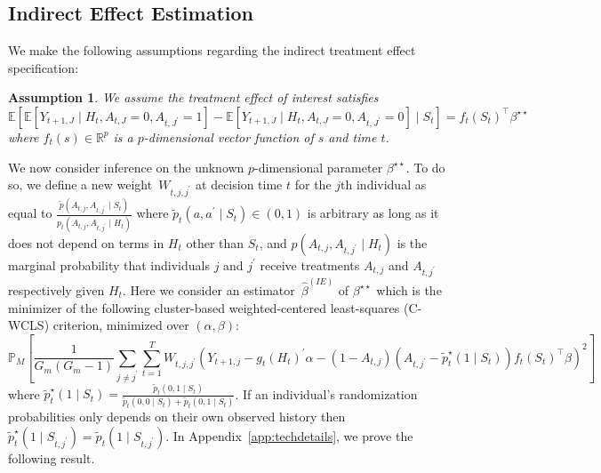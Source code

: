 \documentclass[12pt]{article}
\def\E{\mathbb{E}}
\newtheorem{assumption}[thm]{Assumption}
\begin{document}
\subsection{Indirect Effect Estimation}
\label{section:indirect}

We make the following assumptions regarding the indirect treatment effect specification:

\begin{assumption} \normalfont
\label{ass:indirecteffect}
We assume the treatment effect of interest satisfies
$$
\E \left[ \E \left[ Y_{t+1, J} \mid H_t, A_{t,J} = 0, A_{t,J^\prime} = 1 \right] - \E \left[ Y_{t+1, J} \mid H_t, A_{t,J} = 0, A_{t,J^\prime} = 0 \right] \mid S_t \right] = f_t (S_t)^\top \beta^{\star \star}
$$
where $f_t (s) \in \mathbb{R}^p$ is a $p$-dimensional vector function of $s$ and time $t$.
\end{assumption}

We now consider inference on the unknown $p$-dimensional parameter $\beta^{\star \star}$. To do so, we define a new weight~$W_{t,j, j^\prime}$ at decision time $t$ for the $j$th individual as equal to $\frac{\tilde p (A_{t,j}, A_{t,j^\prime} \mid S_t)}{p_t (A_{t,j}, A_{t,j^\prime} \mid H_t)}$ where $\tilde p_t (a, a^\prime \mid S_t)\in (0,1)$ is arbitrary as long as it does not depend on terms in $H_t$ other than $S_t$, and $p(A_{t,j}, A_{t,j^\prime} \mid H_t)$ is the marginal probability that individuals $j$ and $j^\prime$ receive treatments $A_{t,j}$ and $A_{t,j^\prime}$ respectively given $H_t$.  Here we consider an estimator~$\hat \beta^{(IE)}$ of $\beta^{\star \star}$ which is the minimizer of the following cluster-based weighted-centered least-squares (C-WCLS) criterion, minimized over $(\alpha, \beta)$:
\begin{equation}
\label{eq:indirectwcls}
\mathbb{P}_M \left[ \frac{1}{G_m (G_m-1)} \sum_{j \neq j^\prime} \sum_{t=1}^T W_{t,j, j^\prime} \left(Y_{t+1,j} - g_t (H_t)^\prime \alpha - (1-A_{t,j}) (A_{t,j^\prime} - \tilde p_t^\star (1\mid S_t)) f_t(S_t)^\top \beta \right)^2 \right]
\end{equation}
where $\tilde p_t^\star (1\mid S_t) = \frac{\tilde p_t (0,1 \mid S_t)}{\tilde p_t (0,0 \mid S_t) + \tilde p_t (0,1 \mid S_t)}$.  If an individual's randomization probabilities only depends on their own observed history then $\tilde p_t^\star (1 \mid S_{t,j^\prime}) = \tilde p_t (1 \mid S_{t,j^\prime})$.  In Appendix~\ref{app:techdetails}, we prove the following result.
\end{document}
